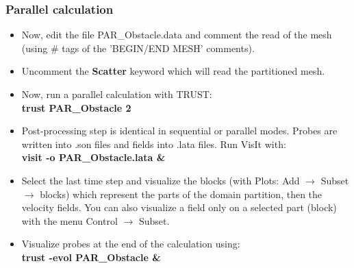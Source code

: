 \documentclass[10pt, hyperref={unicode=true,pdfusetitle, bookmarks=true,bookmarksnumbered=false,bookmarksopen=false, breaklinks=false,pdfborder={0 0l 1},backref=true,colorlinks=true,linkcolor=darkblue,pageanchor}]{beamer}
\begin{document}
\begin{frame}
\frametitle{Parallel calculation}
\begin{block}{}

\begin{itemize}
\item Now, edit the file PAR\_Obstacle.data and comment the read of the mesh
(using \# tags of the 'BEGIN/END MESH' comments).

\item Uncomment the \textbf{Scatter} keyword which will read the partitioned mesh. 


\item Now, run a parallel calculation with TRUST:\\
\textbf{trust PAR\_Obstacle 2}

\item Post-processing step is identical in sequential or parallel modes. Probes are written into .son files and fields into .lata files. Run VisIt with:\\
\textbf{visit -o PAR\_Obstacle.lata \&}

\item Select the last time step and visualize the blocks (with Plots: Add $\rightarrow$ Subset $\rightarrow$ blocks)
which represent the parts of the domain partition, then the velocity fields. You can
also visualize a field only on a selected part (block) with the menu Control $\rightarrow$ Subset.

\item Visualize probes at the end of the calculation using:\\
\textbf{trust -evol PAR\_Obstacle \&}

\end{itemize}

\end{block}
\end{frame}
%
%
\end{document}

